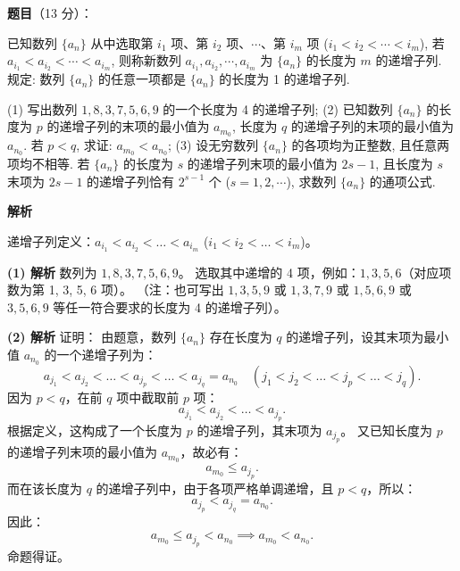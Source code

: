 \begin{answer}

\textbf{题目}（13 分）：

已知数列 $\{a_n\}$ 从中选取第 $i_1$ 项、第 $i_2$ 项、$\cdots$、第 $i_m$ 项 ($i_1 < i_2 < \cdots < i_m$), 若 $a_{i_1} < a_{i_2} < \cdots < a_{i_m}$, 则称新数列 $a_{i_1}, a_{i_2}, \cdots, a_{i_m}$ 为 $\{a_n\}$ 的长度为 $m$ 的递增子列. 规定: 数列 $\{a_n\}$ 的任意一项都是 $\{a_n\}$ 的长度为 1 的递增子列.

(1) 写出数列 $1, 8, 3, 7, 5, 6, 9$ 的一个长度为 4 的递增子列;  
(2) 已知数列 $\{a_n\}$ 的长度为 $p$ 的递增子列的末项的最小值为 $a_{m_0}$, 长度为 $q$ 的递增子列的末项的最小值为 $a_{n_0}$. 若 $p < q$, 求证: $a_{m_0} < a_{n_0}$;  
(3) 设无穷数列 $\{a_n\}$ 的各项均为正整数, 且任意两项均不相等. 若 $\{a_n\}$ 的长度为 $s$ 的递增子列末项的最小值为 $2s - 1$, 且长度为 $s$ 末项为 $2s - 1$ 的递增子列恰有 $2^{s-1}$ 个 ($s = 1, 2, \cdots$), 求数列 $\{a_n\}$ 的通项公式.

\textbf{解析}

递增子列定义：$a_{i_1} < a_{i_2} < \dots < a_{i_m}$ ($i_1 < i_2 < \dots < i_m$)。

\textbf{(1) 解析}
数列为 $1, 8, 3, 7, 5, 6, 9$。
选取其中递增的 4 项，例如：$1, 3, 5, 6$（对应项数为第 1, 3, 5, 6 项）。
（注：也可写出 $1, 3, 5, 9$ 或 $1, 3, 7, 9$ 或 $1, 5, 6, 9$ 或 $3, 5, 6, 9$ 等任一符合要求的长度为 4 的递增子列）。

\textbf{(2) 解析}
证明：
由题意，数列 $\{a_n\}$ 存在长度为 $q$ 的递增子列，设其末项为最小值 $a_{n_0}$ 的一个递增子列为：
\nopagebreak[4]
\[a_{j_1} < a_{j_2} < \dots < a_{j_p} < \dots < a_{j_q} = a_{n_0} \quad (j_1 < j_2 < \dots < j_p < \dots < j_q).\]
因为 $p < q$，在前 $q$ 项中截取前 $p$ 项：
\nopagebreak[4]
\[a_{j_1} < a_{j_2} < \dots < a_{j_p}.\]
根据定义，这构成了一个长度为 $p$ 的递增子列，其末项为 $a_{j_p}$。
又已知长度为 $p$ 的递增子列末项的最小值为 $a_{m_0}$，故必有：
\nopagebreak[4]
\[a_{m_0} \leqslant a_{j_p}.\]
而在该长度为 $q$ 的递增子列中，由于各项严格单调递增，且 $p < q$，所以：
\nopagebreak[4]
\[a_{j_p} < a_{j_q} = a_{n_0}.\]
因此：
\nopagebreak[4]
\[a_{m_0} \leqslant a_{j_p} < a_{n_0} \implies a_{m_0} < a_{n_0}.\]
命题得证。


\end{answer}
